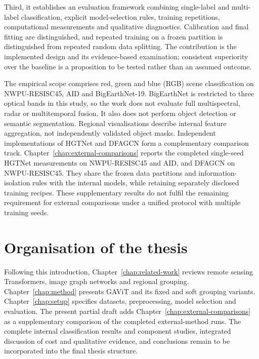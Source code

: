 Third, it establishes an evaluation framework combining single-label and
multi-label classification, explicit model-selection rules, training
repetitions, computational measurements and qualitative diagnostics.
Calibration and final fitting are distinguished, and repeated training on
a frozen partition is distinguished from repeated random data splitting.
The contribution is the implemented design and its evidence-based
examination; consistent superiority over the baseline is a proposition to
be tested rather than an assumed outcome.

The empirical scope comprises red, green and blue (RGB) scene classification on NWPU-RESISC45,
AID and BigEarthNet-19. BigEarthNet is restricted to three optical bands in
this study, so the work does not evaluate full multispectral, radar or
multitemporal fusion. It also does not perform object detection or semantic
segmentation. Regional visualisations describe internal feature aggregation,
not independently validated object masks. Independent implementations of
HGTNet and DFAGCN form a complementary comparison track.
Chapter~\ref{chap:external-comparisons} reports the completed single-seed
HGTNet measurements on NWPU-RESISC45 and AID, and DFAGCN on NWPU-RESISC45.
They share the frozen data partitions and information-isolation rules with
the internal models, while retaining separately disclosed training recipes.
These supplementary results do not fulfil the remaining requirement for
external comparisons under a unified protocol with multiple training seeds.

\section{Organisation of the thesis}

Following this introduction,
Chapter~\ref{chap:related-work} reviews remote sensing Transformers, image graph networks and
regional grouping. Chapter~\ref{chap:method} presents GAViT and its fixed and
soft grouping variants. Chapter~\ref{chap:setup} specifies datasets,
preprocessing, model selection and evaluation. The present partial draft
adds Chapter~\ref{chap:external-comparisons} as a supplementary comparison
of the completed external-method runs. The complete internal classification
results and component studies, integrated discussion of cost and qualitative
evidence, and conclusions remain to be incorporated into the final thesis
structure.
